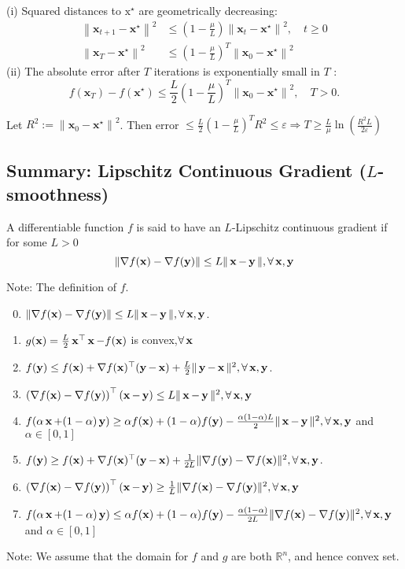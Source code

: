 (i) Squared distances to $\mathrm{x}^{\star}$ are geometrically decreasing:
$$
\begin{aligned}
\left\|\mathbf{x}_{t+1}-\mathbf{x}^{\star}\right\|^{2} &\leq\left(1-\frac{\mu}{L}\right)\left\|\mathbf{x}_{t}-\mathbf{x}^{\star}\right\|^{2}, \quad t \geq 0 \\
\left\|\mathbf{x}_{T}-\mathbf{x}^{\star}\right\|^{2} &\leq\left(1-\frac{\mu}{L}\right)^{T}\left\|\mathbf{x}_{0}-\mathbf{x}^{\star}\right\|^{2}
\end{aligned}
$$
(ii) The absolute error after $T$ iterations is exponentially small in $T$ :
$$
f\left(\mathbf{x}_{T}\right)-f\left(\mathbf{x}^{\star}\right) \leq \frac{L}{2}\left(1-\frac{\mu}{L}\right)^{T}\left\|\mathbf{x}_{0}-\mathbf{x}^{\star}\right\|^{2}, \quad T>0 .
$$

Let $R^{2}:=\left\|\mathbf{x}_{0}-\mathbf{x}^{\star}\right\|^{2}$. Then  error $\leq \frac{L}{2}\left(1-\frac{\mu}{L}\right)^{T} R^{2} \leq \varepsilon \Rightarrow  T \geq \frac{L}{\mu} \ln \left(\frac{R^{2} L}{2 \varepsilon}\right) $


\subsection*{Summary: Lipschitz Continuous Gradient ($L$-smoothness)}
A differentiable function $f$ is said to have an $L$-Lipschitz continuous gradient if for some $L>0$
$$
\|\nabla f(\x)-\nabla f(\y)\| \leq L\|\x-\y\|, \forall \x, \y
$$

Note: The definition of $f$.

\begin{enumerate}[label = (\arabic*), leftmargin=*]
\setcounter{enumi}{-1}
\item $\|\nabla f(\x)-\nabla f(\y)\| \leq L\|\x-\y\|, \forall \x, \y$.
\item $g(\x)=\frac{L}{2} \x^{\top} \x-f(\x)$ is convex,$\forall \x$
\item $f(\y) \leq f(\x)+\nabla f(\x)^{\top}(\y-\x)+\frac{L}{2}\|\y-\x\|^{2}, \forall \x, \y$.
\item  $\left(\nabla f(\x)-\nabla f(\y)\right)^{\top}(\x-\y) \leq L\|\x-\y\|^{2}, \forall \x, \y$
\item $f(\alpha \x+(1-\alpha) \y) \geq \alpha f(\x)+(1-\alpha) f(\y)-\frac{\alpha(1-\alpha) L}{2}\|\x-\y\|^{2}, \forall \x, \y$ and $\alpha \in[0,1]$
\item  $f(\y) \geq f(\x)+\nabla f(\x)^{\top}(\y-\x)+\frac{1}{2 L}\|\nabla f(\y)-\nabla f(\x)\|^{2}, \forall \x, \y$.
\item $\left(\nabla f(\x)-\nabla f(\y)\right)^{\top}(\x-\y) \geq \frac{1}{L}\|\nabla f(\x)-\nabla f(\y)\|^{2}, \forall \x, \y$
\item $f(\alpha \x+(1-\alpha) \y) \leq \alpha f(\x)+(1-\alpha) f(\y)-\frac{\alpha(1-\alpha)}{2 L}\|\nabla f(\x)-\nabla f(\y)\|^{2}, \forall \x, \y$ and $\alpha \in[0,1]$
\end{enumerate}
Note: We assume that the domain for $f$ and $g$ are both $\mathbb{R}^{n}$, and hence convex set.

